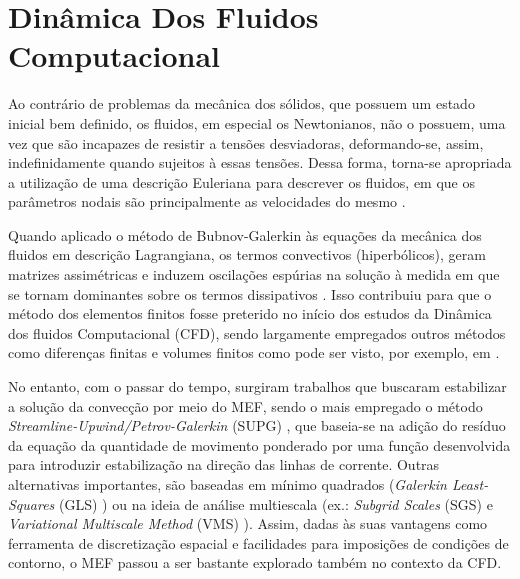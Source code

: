 \section{Dinâmica Dos Fluidos Computacional} \label{CFD}

Ao contrário de problemas da mecânica dos sólidos, que possuem um estado inicial bem definido, os fluidos, em especial os Newtonianos, não o possuem, uma vez que são incapazes de resistir a tensões desviadoras, deformando-se, assim, indefinidamente quando sujeitos à essas tensões. Dessa forma, torna-se apropriada a utilização de uma descrição Euleriana para descrever os fluidos, em que os parâmetros nodais são principalmente as velocidades do mesmo \cite{fernandes2020tecnica}.

Quando aplicado o método de Bubnov-Galerkin às equações da mecânica dos fluidos em descrição Lagrangiana, os termos convectivos (hiperbólicos), geram matrizes assimétricas e induzem oscilações espúrias na solução à medida em que se tornam dominantes sobre os termos dissipativos \cite{bazilevs2013computational,brooks1982streamline}. Isso contribuiu para que o método dos elementos finitos fosse preterido no início dos estudos da Dinâmica dos fluidos Computacional (CFD), sendo largamente empregados outros métodos como diferenças finitas e volumes finitos como pode ser visto, por exemplo, em .

No entanto, com o passar do tempo, surgiram trabalhos que buscaram estabilizar a solução da convecção por meio do MEF, sendo o mais empregado o método \textit{Streamline-Upwind/Petrov-Galerkin} (SUPG) \cite{brooks1982streamline}, que baseia-se na adição do resíduo da equação da quantidade de movimento ponderado por uma função desenvolvida para introduzir estabilização na direção das linhas de corrente. Outras alternativas importantes, são baseadas em mínimo quadrados (\textit{Galerkin Least-Squares} (GLS) \cite{hughes1989new,tezduyar1991stabilized}) ou na ideia de análise multiescala (ex.: \textit{Subgrid Scales} (SGS) \cite{hughes1995multiscale} e \textit{Variational Multiscale Method} (VMS) \cite{Adicionar referencia}). Assim, dadas às suas vantagens como ferramenta de discretização espacial e facilidades para imposições de condições de contorno, o MEF passou a ser bastante explorado também no contexto da CFD.


